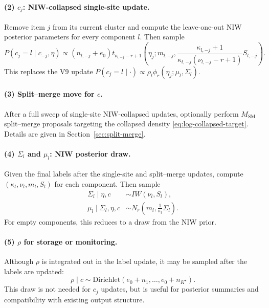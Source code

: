 \documentclass[11pt]{article}
\begin{document}
\paragraph{(2) $c_j$: NIW-collapsed single-site update.}
Remove item $j$ from its current cluster and compute the leave-one-out NIW
posterior parameters for every component $l$.  Then sample
\begin{equation}
    P(c_j=l\mid c_{-j},\eta)
    \propto
    (n_{l,-j}+e_0)
    t_{\nu_{l,-j}-r+1}
    \left(
    \eta_j;
    m_{l,-j},
    \frac{\kappa_{l,-j}+1}
    {\kappa_{l,-j}(\nu_{l,-j}-r+1)}S_{l,-j}
    \right).
    \label{eq:c-update-v10}
\end{equation}
This replaces the V9 update
$P(c_j=l\mid\cdot)\propto \rho_l\phi_r(\eta_j;\mu_l,\Sigma_l)$.

\paragraph{(3) Split--merge move for $c$.}
After a full sweep of single-site NIW-collapsed updates, optionally perform
$M_{\mathrm{SM}}$ split--merge proposals targeting the collapsed density
\eqref{eq:log-collapsed-target}.  Details are given in
Section~\ref{sec:split-merge}.

\paragraph{(4) $\Sigma_l$ and $\mu_l$: NIW posterior draw.}
Given the final labels after the single-site and split--merge updates,
compute $(\kappa_l,\nu_l,m_l,S_l)$ for each component.  Then sample
\begin{align}
    \Sigma_l\mid\eta,c
    &\sim IW(\nu_l,S_l),\\
    \mu_l\mid\Sigma_l,
    \eta,c
    &\sim N_r\left(m_l,\frac{1}{\kappa_l}\Sigma_l\right).
    \label{eq:mu-sigma-update-v10}
\end{align}
For empty components, this reduces to a draw from the NIW prior.

\paragraph{(5) $\rho$ for storage or monitoring.}
Although $\rho$ is integrated out in the label update, it may be sampled
after the labels are updated:
\begin{equation}
    \rho\mid c
    \sim
    \mathrm{Dirichlet}(e_0+n_1,\dots,e_0+n_{K^\star}).
    \label{eq:rho-storage-v10}
\end{equation}
This draw is not needed for $c_j$ updates, but is useful for posterior
summaries and compatibility with existing output structure.
\end{document}
